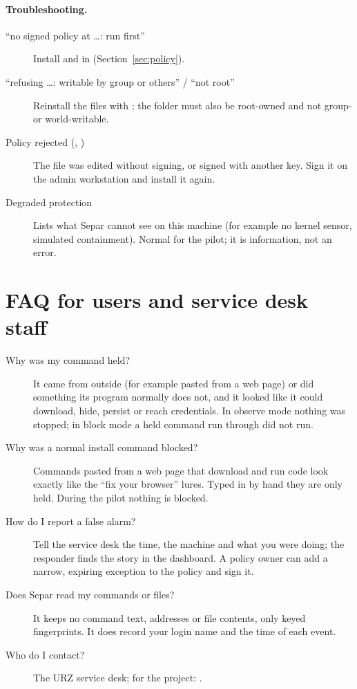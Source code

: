 \documentclass[11pt,a4paper]{article}
\begin{document}
\paragraph{Troubleshooting.}
\begin{description}
  \item[``no signed policy at \ldots: run  first''] Install  and
     in  (Section~\ref{sec:policy}).
  \item[``refusing \ldots: writable by group or others'' / ``not root''] Reinstall the files with
    ; the folder  must also be root-owned and
    not group- or world-writable.
  \item[Policy rejected (, )] The file was edited without signing,
    or signed with another key. Sign it on the admin workstation and install it again.
  \item[Degraded protection] Lists what Separ cannot see on this machine (for example no kernel
    sensor, simulated containment). Normal for the pilot; it is information, not an error.
\end{description}

\section{FAQ for users and service desk staff}
\label{sec:faq}
\begin{description}
  \item[Why was my command held?] It came from outside (for example pasted from a web page) or did
    something its program normally does not, and it looked like it could download, hide, persist or
    reach credentials. In observe mode nothing was stopped; in block mode a held command run through
     did not run.
  \item[Why was a normal install command blocked?] Commands pasted from a web page that download
    and run code look exactly like the ``fix your browser'' lures. Typed in by hand they are only
    held. During the pilot nothing is blocked.
  \item[How do I report a false alarm?] Tell the service desk the time, the machine and what you
    were doing; the responder finds the story in the dashboard. A policy owner can add a narrow,
    expiring exception to the policy and sign it.
  \item[Does Separ read my commands or files?] It keeps no command text, addresses or file contents,
    only keyed fingerprints. It does record your login name and the time of each event.
  \item[Who do I contact?] The URZ service desk; for the project: \contact.
\end{description}
\end{document}
